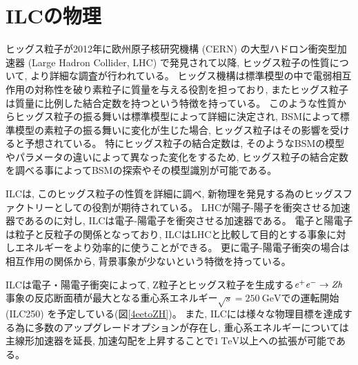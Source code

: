 \section{ILCの物理} \label{Intro:PhysicsofILC}

ヒッグス粒子が2012年に欧州原子核研究機構 (CERN) の大型ハドロン衝突型加速器 (Large Hadron Collider, LHC) で発見されて以降, ヒッグス粒子の性質について, より詳細な調査が行われている。
ヒッグス機構は標準模型の中で電弱相互作用の対称性を破り素粒子に質量を与える役割を担っており, またヒッグス粒子は質量に比例した結合定数を持つという特徴を持っている。
このような性質からヒッグス粒子の振る舞いは標準模型によって詳細に決定され, BSMによって標準模型の素粒子の振る舞いに変化が生じた場合, ヒッグス粒子はその影響を受けると予想されている。
特にヒッグス粒子の結合定数は, そのようなBSMの模型やパラメータの違いによって異なった変化をするため, ヒッグス粒子の結合定数を調べる事によってBSMの探索やその模型識別が可能である。

ILCは, このヒッグス粒子の性質を詳細に調べ, 新物理を発見する為のヒッグスファクトリーとしての役割が期待されている。
LHCが陽子-陽子を衝突させる加速器であるのに対し, ILCは電子-陽電子を衝突させる加速器である。
電子と陽電子は粒子と反粒子の関係となっており, ILCはLHCと比較して目的とする事象に対しエネルギーをより効率的に使うことができる。
更に電子-陽電子衝突の場合は相互作用の関係から, 背景事象が少ないという特徴を持っている。

ILCは電子・陽電子衝突によって, Z粒子とヒッグス粒子を生成する$\it e^+e^- \to Zh$事象の反応断面積が最大となる重心系エネルギー$\sqrt{s}=250\ \mathrm{GeV}$での運転開始 (ILC250) を予定している(図\ref{4eetoZH})。
また, ILCには様々な物理目標を達成する為に多数のアップグレードオプションが存在し, 重心系エネルギーについては主線形加速器を延長, 加速勾配を上昇することで$1\ \mathrm{TeV}$以上への拡張が可能である。\\

